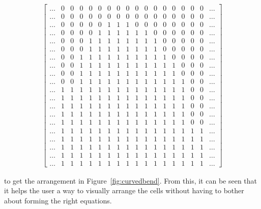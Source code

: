 \begin{itemize}
\begin{align}
\left[\begin{array}{cccccccccccccccccc}
\dotsc & 0 & 0 & 0 & 0 & 0 & 0 & 0 & 0 & 0 & 0 & 0 & 0 & 0 & 0 & 0 & 0 & \dotsc\\
\dotsc & 0 & 0 & 0 & 0 & 0 & 0 & 0 & 0 & 0 & 0 & 0 & 0 & 0 & 0 & 0 & 0 & \dotsc\\
\dotsc & 0 & 0 & 0 & 0 & 0 & 1 & 1 & 1 & 0 & 0 & 0 & 0 & 0 & 0 & 0 & 0 & \dotsc\\
\dotsc & 0 & 0 & 0 & 0 & 1 & 1 & 1 & 1 & 1 & 1 & 0 & 0 & 0 & 0 & 0 & 0 & \dotsc\\
\dotsc & 0 & 0 & 0 & 1 & 1 & 1 & 1 & 1 & 1 & 1 & 1 & 0 & 0 & 0 & 0 & 0 & \dotsc\\
\dotsc & 0 & 0 & 0 & 1 & 1 & 1 & 1 & 1 & 1 & 1 & 1 & 0 & 0 & 0 & 0 & 0 & \dotsc\\
\dotsc & 0 & 0 & 1 & 1 & 1 & 1 & 1 & 1 & 1 & 1 & 1 & 1 & 0 & 0 & 0 & 0 & \dotsc\\
\dotsc & 0 & 0 & 1 & 1 & 1 & 1 & 1 & 1 & 1 & 1 & 1 & 1 & 1 & 0 & 0 & 0 & \dotsc\\
\dotsc & 0 & 0 & 1 & 1 & 1 & 1 & 1 & 1 & 1 & 1 & 1 & 1 & 1 & 0 & 0 & 0 & \dotsc\\
\dotsc & 0 & 0 & 1 & 1 & 1 & 1 & 1 & 1 & 1 & 1 & 1 & 1 & 1 & 1 & 0 & 0 & \dotsc\\
\dotsc & 1 & 1 & 1 & 1 & 1 & 1 & 1 & 1 & 1 & 1 & 1 & 1 & 1 & 1 & 0 & 0 & \dotsc\\
\dotsc & 1 & 1 & 1 & 1 & 1 & 1 & 1 & 1 & 1 & 1 & 1 & 1 & 1 & 1 & 0 & 0 & \dotsc\\
\dotsc & 1 & 1 & 1 & 1 & 1 & 1 & 1 & 1 & 1 & 1 & 1 & 1 & 1 & 1 & 0 & 0 & \dotsc\\
\dotsc & 1 & 1 & 1 & 1 & 1 & 1 & 1 & 1 & 1 & 1 & 1 & 1 & 1 & 1 & 0 & 0 & \dotsc\\
\dotsc & 1 & 1 & 1 & 1 & 1 & 1 & 1 & 1 & 1 & 1 & 1 & 1 & 1 & 1 & 0 & 0 & \dotsc\\
\dotsc & 1 & 1 & 1 & 1 & 1 & 1 & 1 & 1 & 1 & 1 & 1 & 1 & 1 & 1 & 1 & 1 & \dotsc\\
\dotsc & 1 & 1 & 1 & 1 & 1 & 1 & 1 & 1 & 1 & 1 & 1 & 1 & 1 & 1 & 1 & 1 & \dotsc\\
\dotsc & 1 & 1 & 1 & 1 & 1 & 1 & 1 & 1 & 1 & 1 & 1 & 1 & 1 & 1 & 1 & 1 & \dotsc\\
\dotsc & 1 & 1 & 1 & 1 & 1 & 1 & 1 & 1 & 1 & 1 & 1 & 1 & 1 & 1 & 1 & 1 & \dotsc\\
\dotsc & 1 & 1 & 1 & 1 & 1 & 1 & 1 & 1 & 1 & 1 & 1 & 1 & 1 & 1 & 1 & 1 & \dotsc
\end{array}\right]
\end{align}

to get the arrangement in Figure~\ref{fig:curvedbend}. From this, it can be
seen that it helps the user a way to visually arrange the cells without having
to bother about forming the right equations.

\end{itemize}

